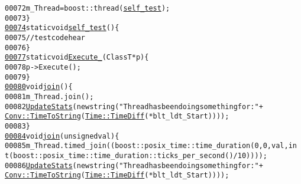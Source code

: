 \begin{footnotesize}
\begin{alltt}
00072                 m\_Thread = boost::thread (\hyperlink{classbuskol_1_1ThreadTemplates_1_1thread__1_ac33a5aa33679452b203c539401c92929}{self_test});
00073             \}
\hypertarget{myThreadTemplates_8hpp_source_l00074}{}\hyperlink{classbuskol_1_1ThreadTemplates_1_1thread__1_ac33a5aa33679452b203c539401c92929}{00074}             \textcolor{keyword}{static} \textcolor{keywordtype}{void} \hyperlink{classbuskol_1_1ThreadTemplates_1_1thread__1_ac33a5aa33679452b203c539401c92929}{self_test}()\{
00075                 \textcolor{comment}{//test code hear}
00076             \}
\hypertarget{myThreadTemplates_8hpp_source_l00077}{}\hyperlink{classbuskol_1_1ThreadTemplates_1_1thread__1_a37cde0d5c6105d9194ce1cf981cf9c5a}{00077}             \textcolor{keyword}{static} \textcolor{keywordtype}{void} \hyperlink{classbuskol_1_1ThreadTemplates_1_1thread__1_a37cde0d5c6105d9194ce1cf981cf9c5a}{Execute_}(ClassT *p)\{
00078                 p->Execute();
00079             \}
\hypertarget{myThreadTemplates_8hpp_source_l00080}{}\hyperlink{classbuskol_1_1ThreadTemplates_1_1thread__1_af917523b30feb06614e96371a5c198ed}{00080}             \textcolor{keywordtype}{void} \hyperlink{classbuskol_1_1ThreadTemplates_1_1thread__1_af917523b30feb06614e96371a5c198ed}{join}()\{
00081                 m\_Thread.join();
00082                 \hyperlink{classbuskol_1_1ThreadTemplates_1_1thread__1_ab97928f6c8b8c75b33ffd6e57514d692}{UpdateStats}(\textcolor{keyword}{new} \textcolor{keywordtype}{string}(\textcolor{stringliteral}{"Thread has been doing something for: "}+ 
      \hyperlink{group__libbuskol_ga6c72f99eb28381403eb06abee5ea7c44}{Conv::TimeToString}(\hyperlink{group__libbuskol_gac6d1980cc97a5c78f36a3fd96ceaa573}{Time::TimeDiff}(*blt\_ldt\_Start))));
00083             \}
\hypertarget{myThreadTemplates_8hpp_source_l00084}{}\hyperlink{classbuskol_1_1ThreadTemplates_1_1thread__1_a7c62551333aad740fc7b48742cdeb877}{00084}             \textcolor{keywordtype}{void} \hyperlink{classbuskol_1_1ThreadTemplates_1_1thread__1_a7c62551333aad740fc7b48742cdeb877}{join}(\textcolor{keywordtype}{unsigned} val)\{
00085                 m\_Thread.timed\_join(( boost::posix\_time::time\_duration(0,0,val,\textcolor{keywordtype}{in
      t}(boost::posix\_time::time\_duration::ticks\_per\_second() / 10))));
00086                 \hyperlink{classbuskol_1_1ThreadTemplates_1_1thread__1_ab97928f6c8b8c75b33ffd6e57514d692}{UpdateStats}(\textcolor{keyword}{new} \textcolor{keywordtype}{string}(\textcolor{stringliteral}{"Thread has been doing something for: "}+ 
      \hyperlink{group__libbuskol_ga6c72f99eb28381403eb06abee5ea7c44}{Conv::TimeToString}(\hyperlink{group__libbuskol_gac6d1980cc97a5c78f36a3fd96ceaa573}{Time::TimeDiff}(*blt\_ldt\_Start))));

\end{alltt}
\end{footnotesize}
